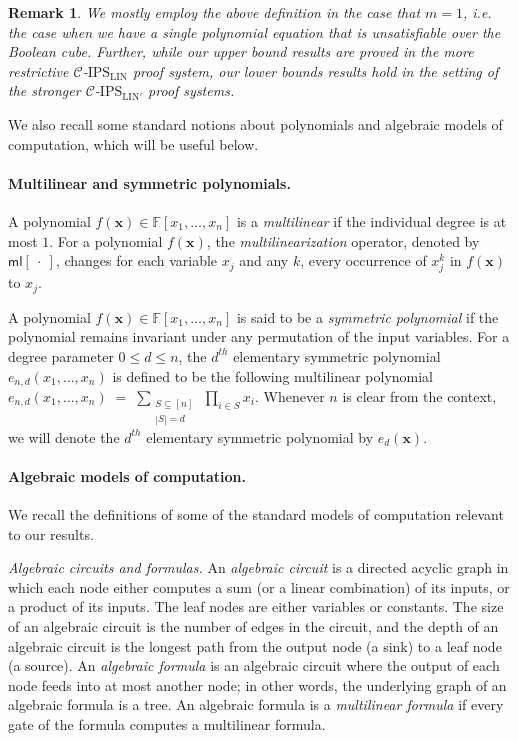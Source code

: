 \documentclass[11pt]{article}
\newtheorem{remark}[theorem]{Remark}
\newcommand{\F}{\mathbb{F}}
\newcommand{\IPSLIN}{\mathrm{IPS}_{\mathrm{LIN}}}
\newcommand{\IPSLINp}{\mathrm{IPS}_{\mathrm{LIN}'}}
\newcommand{\ml}{\mathsf{ml}}
\begin{document}
\begin{remark}
    \label{rem:def-pf-systems}
    We mostly employ the above definition in the case that $m=1$, i.e. the case when we have a single polynomial equation that is unsatisfiable over the Boolean cube. Further, while our upper bound results are proved in the more restrictive $\mathcal{C}$-$\IPSLIN$ proof system, our lower bounds results hold in the setting of the stronger $\mathcal{C}$-$\IPSLINp$ proof systems. 
\end{remark}

We also recall some standard notions about polynomials and algebraic models of computation, which will be useful below. 

\paragraph{Multilinear and symmetric polynomials.}
A polynomial $f(\mathbf{x}) \in \F[x_{1},\ldots,x_{n}]$ is a \emph{multilinear} if the individual degree is at most $1$. For a polynomial $f(\mathbf{x})$, the \emph{multilinearization} operator, denoted by $\ml[~\cdot~]$, changes for each variable $x_{j}$ and any $k$, every occurrence of $x_{j}^{k}$ in $f(\mathbf{x})$ to $x_{j}$.

A polynomial $f(\mathbf{x}) \in \F[x_{1},\ldots,x_{n}]$ is said to be a \emph{symmetric polynomial} if the polynomial remains invariant under any permutation of the input variables. For a degree parameter $0 \leq d \leq n$, the $d^{th}$ elementary symmetric polynomial $e_{n,d}(x_{1},\ldots,x_{n})$ is defined to be the following multilinear polynomial $e_{n,d}(x_{1},\ldots,x_{n}) \; = \; \sum_{\substack{S \subseteq [n] \\ |S| = d}} \, \prod_{i \in S} x_{i}$. Whenever $n$ is clear from the context, we will denote the $d^{th}$ elementary symmetric polynomial by $e_{d}(\mathbf{x})$.


\paragraph{Algebraic models of computation.}
We recall the definitions of some of the standard models of computation relevant to our results.

\textit{Algebraic circuits and formulas.} An \emph{algebraic circuit} is a directed acyclic graph in which each node either computes a sum (or a linear combination) of its inputs, or a product of its inputs. The leaf nodes are either variables or constants. The size of an algebraic circuit is the number of edges in the circuit, and the depth of an algebraic circuit is the longest path from the output node (a sink) to a leaf node (a source). An \emph{algebraic formula} is an algebraic circuit where the output of each node feeds into at most another node; in other words, the underlying graph of an algebraic formula is a tree. An algebraic formula is a \emph{multilinear formula} if every gate of the formula computes a multilinear formula.
\end{document}
